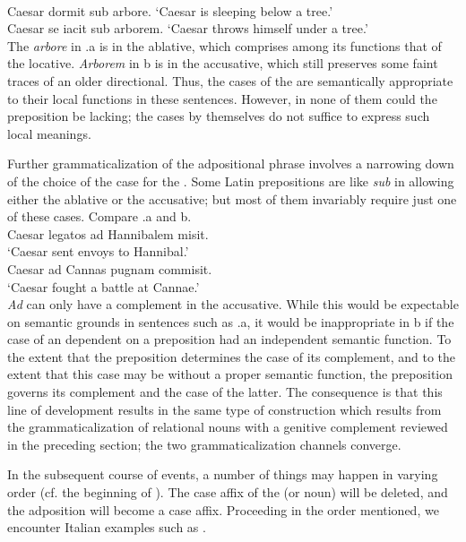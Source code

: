 \ea\label{ex:E71}
\\
\ea Caesar dormit sub arbore.
\glt ‘Caesar is sleeping below a tree.’\\
\ex Caesar se iacit sub arborem.
\glt ‘Caesar throws himself under a tree.’\\
\z
\z
\noindent \label{page99}The \np \textit{arbore} in .a is in the ablative, which comprises among its functions that of the locative. \textit{Arborem} in b is in the accusative, which still preserves some faint traces of an older directional. Thus, the cases of the \nps are semantically appropriate to their local functions in these sentences. However, in none of them could the preposition be lacking; the cases by themselves do not suffice to express such local meanings.

\label{page100c}Further grammaticalization of the adpositional phrase involves a narrowing down of the choice of the case for the \np. Some Latin prepositions are like \textit{sub} in allowing either the ablative or the accusative; but most of them invariably require just one of these cases. Compare .a and b.
\newpage
\ea\label{ex:E72}
 \\
 \ea  Caesar legatos ad Hannibalem misit.\\

\glt ‘Caesar sent envoys to Hannibal.’\\
\ex  Caesar ad Cannas pugnam commisit.\\
\glt ‘Caesar fought a battle at Cannae.’\\
\z
\z
\noindent \textit{Ad} can only have a complement in the accusative. While this would be expectable on semantic grounds in sentences such as .a, it would be inappropriate in b if the case of an \np dependent on a preposition had an independent semantic function. To the extent that the preposition determines the case of its complement, and to the extent that this case may be without a proper semantic function, the preposition governs its complement and the case of the latter. The consequence is that this line of development results in the same type of construction which results from the grammaticalization of relational nouns with a genitive complement reviewed in the preceding section; the two grammaticalization channels converge.

In the subsequent course of events, a number of things may happen in varying order (cf. the beginning of ). The case affix of the \np (or noun) will be deleted, and the adposition will become a case affix. Proceeding in the order mentioned, we encounter Italian examples such as .

